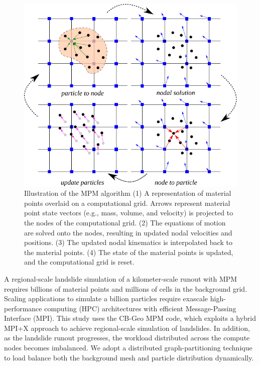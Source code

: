 \documentclass[journal]{IEEEtran}
\begin{document}
\begin{figure}[!htbp]
    \centering
    \includegraphics[width=\linewidth]{figs/mpm.pdf}
    \caption{Illustration of the MPM algorithm (1) A representation of material points overlaid on a computational grid. Arrows represent material point state vectors (e.g., mass, volume, and velocity) is projected to the nodes of the computational grid. (2) The equations of motion are solved onto the nodes, resulting in updated nodal velocities and positions. (3) The updated nodal kinematics is interpolated back to the material points. (4) The state of the material points is updated, and the computational grid is reset.}
    \label{fig:mpm}
\end{figure}

A regional-scale landslide simulation of a kilometer-scale runout with MPM requires billions of material points and millions of cells in the background grid. Scaling applications to simulate a billion particles require exascale high-performance computing (HPC) architectures with efficient Message-Passing Interface (MPI). This study uses the CB-Geo MPM code, which exploits a hybrid MPI+X approach to achieve regional-scale simulation of landslides. In addition, as the landslide runout progresses, the workload distributed across the compute nodes becomes imbalanced. We adopt a distributed graph-partitioning technique to load balance both the background mesh and particle distribution dynamically.
\end{document}

